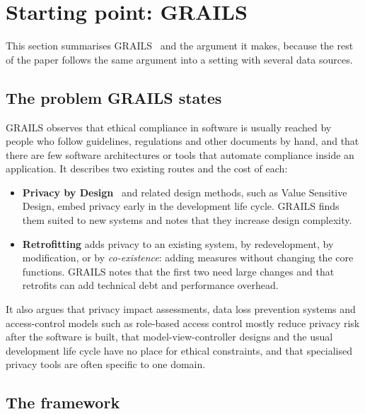 \section{Starting point: GRAILS}
\label{sec:grails}

This section summarises GRAILS~\citep{kulkarni2025grails} and the argument it
makes, because the rest of the paper follows the same argument into a setting
with several data sources.

\subsection{The problem GRAILS states}

GRAILS observes that ethical compliance in software is usually reached by
people who follow guidelines, regulations and other documents by hand, and
that there are few software architectures or tools that automate compliance
inside an application. It describes two existing routes and the cost of each:
\begin{itemize}
  \item \textbf{Privacy by Design}~\citep{cavoukian2010privacy} and related
        design methods, such as Value Sensitive Design, embed privacy early in
        the development life cycle. GRAILS finds them suited to new systems and
        notes that they increase design complexity.
  \item \textbf{Retrofitting} adds privacy to an existing system, by
        redevelopment, by modification, or by \emph{co-existence}: adding
        measures without changing the core functions. GRAILS notes that the
        first two need large changes and that retrofits can add technical debt
        and performance overhead.
\end{itemize}
It also argues that privacy impact assessments, data loss prevention systems
and access-control models such as role-based access control mostly reduce
privacy risk after the software is built, that model-view-controller designs
and the usual development life cycle have no place for ethical constraints,
and that specialised privacy tools are often specific to one domain.

\subsection{The framework}

